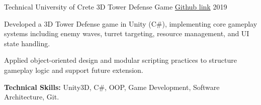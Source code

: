 \begin{cventries}
  \cventry
    {Technical University of Crete} %
    {3D Tower Defense Game} %
    {\href{https://github.com/SotirisKavv/tower-defense}{Github link}} %
    {2019} %
    {
      \begin{cvitems} %
        \item {Developed a 3D Tower Defense game in Unity (C\#), implementing core gameplay systems including enemy waves, turret targeting, resource management, and UI state handling.}
        \item {Applied object-oriented design and modular scripting practices to structure gameplay logic and support future extension.}
        \item {\textbf{Technical Skills:} Unity3D, C\#, OOP, Game Development, Software Architecture, Git.}
      \end{cvitems}
    }


\end{cventries}
